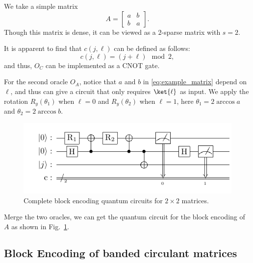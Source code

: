 \documentclass{article}
\begin{document}
We take a simple matrix
\begin{equation}
  A =
  \begin{bmatrix}
    a & b \\
    b & a
  \end{bmatrix}.\label{eq:example_matrix}
\end{equation}
Though this matrix is dense, it can be viewed as a $2$-sparse matrix with $s=2$.

It is apparent to find that $c(j,\ell)$ can be defined as follows:
\begin{equation}
  c(j,\ell) =(j + \ell) \mod 2,\label{eq:equation12}
\end{equation}
and thus, $O_C$ can be implemented as a CNOT gate.

For the second oracle $O_A$, notice that $a$ and $b$ in \ref{eq:example_matrix} depend on $\ell$, and thus can give a circuit that only requires $\ket{\ell}$ as input. We apply the rotation $R_y(\theta_1)$ when $\ell=0$ and $R_y(\theta_2)$ when $\ell=1$, here $\theta_1 = 2\arccos a$ and $\theta_2 = 2\arccos b$.

\begin{figure}[htbp]
  \centering
  \includegraphics{pdf/2x2_circuit}
  \caption{
    Complete block encoding quantum circuits for $2\times2$ matrices.
  }
  \label{fig:2x2_circuit}
\end{figure}

Merge the two oracles, we can get the quantum circuit for the block encoding of $A$ as shown in Fig.~\ref{fig:2x2_circuit}.

\subsection{Block Encoding of banded circulant matrices}
\end{document}
